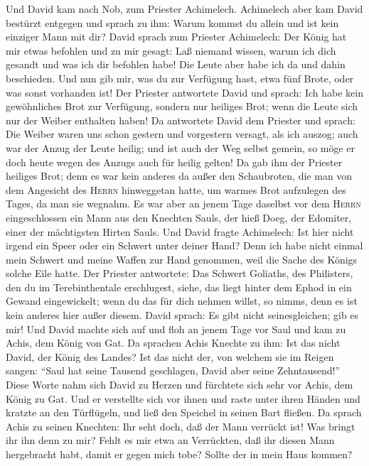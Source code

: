  Und David kam nach Nob, zum Priester Achimelech.
Achimelech aber kam David bestürzt entgegen und sprach zu ihm: Warum
kommst du allein und ist kein einziger Mann mit dir? 
David sprach zum Priester Achimelech: Der König hat mir etwas befohlen
und zu mir gesagt: Laß niemand wissen, warum ich dich gesandt und was
ich dir befohlen habe! Die Leute aber habe ich da und dahin beschieden.
 Und nun gib mir, was du zur Verfügung hast, etwa fünf
Brote, oder was sonst vorhanden ist!  Der Priester
antwortete David und sprach: Ich habe kein gewöhnliches Brot zur
Verfügung, sondern nur heiliges Brot; wenn die Leute sich nur der Weiber
enthalten haben!  Da antwortete David dem Priester und
sprach: Die Weiber waren uns schon gestern und vorgestern versagt, als
ich auszog; auch war der Anzug der Leute heilig; und ist auch der Weg
selbst gemein, so möge er doch heute wegen des Anzugs auch für heilig
gelten!  Da gab ihm der Priester heiliges Brot; denn es
war kein anderes da außer den Schaubroten, die man von dem Angesicht des
\textsc{Herrn} hinweggetan hatte, um warmes Brot aufzulegen des Tages,
da man sie wegnahm.  Es war aber an jenem Tage daselbst
vor dem \textsc{Herrn} eingeschlossen ein Mann aus den Knechten Sauls,
der hieß Doeg, der Edomiter, einer der mächtigsten Hirten Sauls.
 Und David fragte Achimelech: Ist hier nicht irgend ein
Speer oder ein Schwert unter deiner Hand? Denn ich habe nicht einmal
mein Schwert und meine Waffen zur Hand genommen, weil die Sache des
Königs solche Eile hatte.  Der Priester antwortete: Das
Schwert Goliaths, des Philisters, den du im Terebinthentale erschlugest,
siehe, das liegt hinter dem Ephod in ein Gewand eingewickelt; wenn du
das für dich nehmen willst, so nimm\textquotesingle s, denn es ist kein
anderes hier außer diesem. David sprach: Es gibt nicht seinesgleichen;
gib es mir!  Und David machte sich auf und floh an jenem
Tage vor Saul und kam zu Achis, dem König von Gat.  Da
sprachen Achis\textquotesingle{} Knechte zu ihm: Ist das nicht David,
der König des Landes? Ist das nicht der, von welchem sie im Reigen
sangen: ``Saul hat seine Tausend geschlagen, David aber seine
Zehntausend!''  Diese Worte nahm sich David zu Herzen und
fürchtete sich sehr vor Achis, dem König zu Gat.  Und er
verstellte sich vor ihnen und raste unter ihren Händen und kratzte an
den Türflügeln, und ließ den Speichel in seinen Bart fließen.
 Da sprach Achis zu seinen Knechten: Ihr seht doch, daß
der Mann verrückt ist! Was bringt ihr ihn denn zu mir? 
Fehlt es mir etwa an Verrückten, daß ihr diesen Mann hergebracht habt,
damit er gegen mich tobe? Sollte der in mein Haus kommen?

